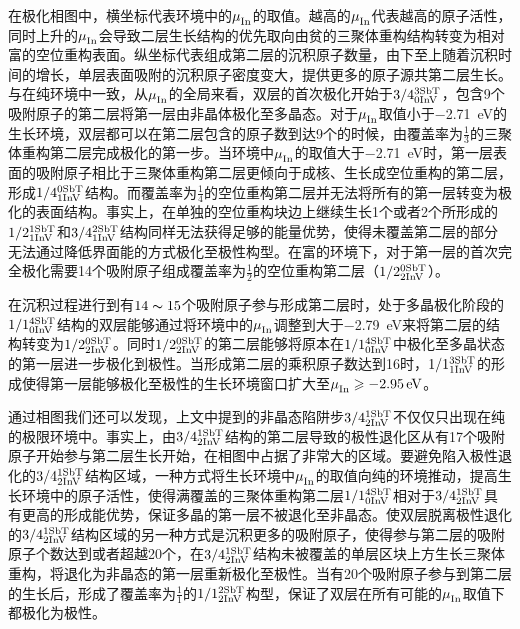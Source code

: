 在极化相图中，横坐标代表环境中的$\it \mu_{\rm In}^{\rm } \it$的取值。越高的$\it \mu_{\rm In}^{\rm } \it$代表越高的原子活性，同时上升的$\it \mu_{\rm In}^{\rm } \it$会导致二层生长结构的优先取向由贫的三聚体重构结构转变为相对富的空位重构表面。纵坐标代表组成第二层的沉积原子数量，由下至上随着沉积时间的增长，单层表面吸附的沉积原子密度变大，提供更多的原子源共第二层生长。与在纯环境中一致，从$\it \mu_{\rm In}^{\rm } \it$的全局来看，双层的首次极化开始于$\rm 3/4{}_{0InV}^{3SbT} \it$，包含9个吸附原子的第二层将第一层由非晶体极化至多晶态。对于$\it \mu_{\rm In}^{\rm } \it$取值小于\SI{-2.71}{\electronvolt}的生长环境，双层都可以在第二层包含的原子数到达9个的时候，由覆盖率为$\frac{1}{3}$的三聚体重构第二层完成极化的第一步。当环境中$\it \mu_{\rm In}^{\rm } \it$的取值大于\SI{-2.71}{\electronvolt}时，第一层表面的吸附原子相比于三聚体重构第二层更倾向于成核、生长成空位重构的第二层，形成$\rm 1/4{}_{1InV}^{0SbT} \it$结构。而覆盖率为$\frac{1}{4}$的空位重构第二层并无法将所有的第一层转变为极化的表面结构。事实上，在单独的空位重构块边上继续生长1个或者2个所形成的$\rm 1/2{}_{1InV}^{1SbT} \it$和$\rm 3/4{}_{1InV}^{2SbT} \it$结构同样无法获得足够的能量优势，使得未覆盖第二层的部分无法通过降低界面能的方式极化至极性构型。在富的环境下，对于第一层的首次完全极化需要14个吸附原子组成覆盖率为$\frac{1}{2}$的空位重构第二层（$\rm 1/2{}_{2InV}^{0SbT} \it$）。

在沉积过程进行到有$14\thicksim 15$个吸附原子参与形成第二层时，处于多晶极化阶段的$\rm 1/1{}_{0InV}^{4SbT} \it$结构的双层能够通过将环境中的$\it \mu_{\rm In}^{\rm } \it$调整到大于\SI{-2.79}{\electronvolt}来将第二层的结构转变为$\rm 1/2{}_{2InV}^{0SbT} \it$。同时$\rm 1/2{}_{2InV}^{0SbT} \it$的第二层能够将原本在$\rm 1/1{}_{0InV}^{4SbT} \it$中极化至多晶状态的第一层进一步极化到极性。当形成第二层的乘积原子数达到16时，$\rm 1/1{}_{1InV}^{3SbT} \it$的形成使得第一层能够极化至极性的生长环境窗口扩大至$\it \mu_{\rm In}^{\rm } \it \geqslant \SI{-2.95}{\electronvolt}$。

通过相图我们还可以发现，上文中提到的非晶态陷阱步$\rm 3/4{}_{2InV}^{1SbT} \it$不仅仅只出现在纯的极限环境中。事实上，由$\rm 3/4{}_{2InV}^{1SbT} \it$结构的第二层导致的极性退化区从有17个吸附原子开始参与第二层生长开始，在相图中占据了非常大的区域。要避免陷入极性退化的$\rm 3/4{}_{2InV}^{1SbT} \it$结构区域，一种方式将生长环境中$\it \mu_{\rm In}^{\rm } \it$的取值向纯的环境推动，提高生长环境中的原子活性，使得满覆盖的三聚体重构第二层$\rm 1/1{}_{0InV}^{4SbT} \it$相对于$\rm 3/4{}_{2InV}^{1SbT} \it$具有更高的形成能优势，保证多晶的第一层不被退化至非晶态。使双层脱离极性退化的$\rm 3/4{}_{2InV}^{1SbT} \it$结构区域的另一种方式是沉积更多的吸附原子，使得参与第二层的吸附原子个数达到或者超越20个，在$\rm 3/4{}_{2InV}^{1SbT} \it$结构未被覆盖的单层区块上方生长三聚体重构，将退化为非晶态的第一层重新极化至极性。当有20个吸附原子参与到第二层的生长后，形成了覆盖率为$\frac{1}{1}$的$\rm 1/1{}_{2InV}^{2SbT} \it$构型，保证了双层在所有可能的$\it \mu_{\rm In}^{\rm } \it$取值下都极化为极性。


